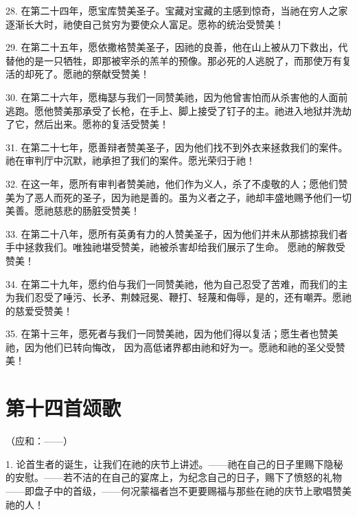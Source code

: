 28. 在第二十四年，愿宝库赞美圣子。宝藏对宝藏的主感到惊奇，当祂在穷人之家逐渐长大时，祂使自己贫穷为要使众人富足。愿祢的统治受赞美！\par

29. 在第二十五年，愿依撒格赞美圣子，因祂的良善，他在山上被从刀下救出，代替他的是一只牺牲，即那被宰杀的羔羊的预像。那必死的人逃脱了，而那使万有复活的却死了。愿祂的祭献受赞美！\par

30. 在第二十六年，愿梅瑟与我们一同赞美祂，因为他曾害怕而从杀害他的人面前逃跑。愿他赞美那承受了长枪，在手上、脚上接受了钉子的主。祂进入地狱并洗劫了它，然后出来。愿祢的复活受赞美！\par

31. 在第二十七年，愿善辩者赞美圣子，因为他们找不到外衣来拯救我们的案件。祂在审判厅中沉默，祂承担了我们的案件。愿光荣归于祂！\par

32. 在这一年，愿所有审判者赞美祂，他们作为义人，杀了不虔敬的人；愿他们赞美为了恶人而死的圣子，因为祂是善的。虽为义者之子，祂却丰盛地赐予他们一切美善。愿祂慈悲的肠脏受赞美！\par

33. 在第二十八年，愿所有英勇有力的人赞美圣子，因为他们并未从那掳掠我们者手中拯救我们。唯独祂堪受赞美，祂被杀害却给我们展示了生命。 愿祂的解救受赞美！\par

34. 在第二十九年，愿约伯与我们一同赞美祂，他为自己忍受了苦难，而我们的主为我们忍受了唾污、长矛、荆棘冠冕、鞭打、轻蔑和侮辱，是的，还有嘲弄。愿祂的慈爱受赞美！\par

35. 在第十三年，愿死者与我们一同赞美祂，因为他们得以复活；愿生者也赞美祂，因为他们已转向悔改， 因为高低诸界都由祂和好为一。愿祂和祂的圣父受赞美！\par


\section{第十四首颂歌}

（应和：——）\par

1. 论首生者的诞生，让我们在祂的庆节上讲述。——祂在自己的日子里赐下隐秘的安慰。——若不洁的在自己的宴席上，为纪念自己的日子，赐下了愤怒的礼物——即盘子中的首级，——何况蒙福者岂不更要赐福与那些在祂的庆节上歌唱赞美祂的人！\par

